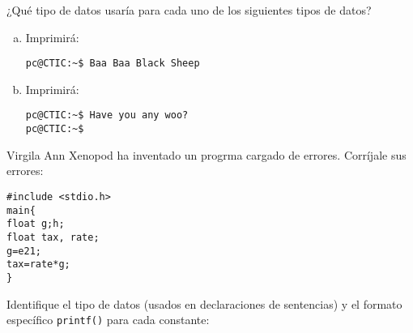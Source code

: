 \documentclass[spanish,addpoints,answers,a4paper]{exam}
\begin{document}
\begin{questions}

\question ¿Qué tipo de datos usaría para cada uno de los siguientes tipos de datos?

\begin{solution}
\begin{multicols}{2}
\begin{enumerate}[(a)]

\item Imprimirá:

\begin{verbatim}
pc@CTIC:~$ Baa Baa Black Sheep
\end{verbatim}

\item Imprimirá:

\begin{verbatim}
pc@CTIC:~$ Have you any woo?
pc@CTIC:~$ 
\end{verbatim}

\end{enumerate}
\end{multicols}
\end{solution}

\question Virgila Ann Xenopod ha inventado un progrma cargado de errores. Corríjale sus errores:

\begin{verbatim}
#include <stdio.h>
main{
float g;h;
float tax, rate;
g=e21;
tax=rate*g;
}
\end{verbatim}

\question Identifique el tipo de datos (usados en declaraciones de sentencias) y el formato específico \texttt{printf()} para cada constante:


\end{questions}
\end{document}
